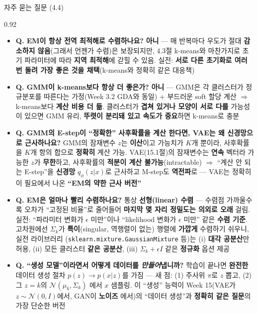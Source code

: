 \begin{frame}[shrink=33]{자주 묻는 질문 (4.4)}
\begin{center}\begin{varwidth}{0.92\textwidth}
  \small
  \begin{itemize}
    \item \textbf{Q. EM이 항상 전역 최적해로 수렴하나요?}
      \textbf{아니} --- 매 반복마다 우도가 절대 \textbf{감소하지
      않음}(그래서 언젠가 수렴)은 보장되지만, 4.3절 k-means와
      마찬가지로 초기 파라미터에 따라 \textbf{지역 최적해}에
      갇힐 수 있음. 실전: \textbf{서로 다른 초기화로 여러 번
      돌려 가장 좋은 것을 채택}(k-means와 정확히 같은 대응책)
    \item \textbf{Q. GMM이 k-means보다 항상 더 좋은가?}
      \textbf{아니} --- GMM은 각 클러스터가 정규분포를 따른다는
      가정(Week 3.2 GDA와 동일) + 부드러운 soft 할당 계산
      $\Rightarrow$ k-means보다 \textbf{계산 비용 더 듦}.
      클러스터가 \textbf{겹쳐 있거나 모양이 서로 다를} 가능성이
      있으면 GMM 유리, \textbf{뚜렷이 분리돼 있고 속도가
      중요}하면 k-means로 충분
    \item \textbf{Q. GMM의 E-step이 ``정확한'' 사후확률을 계산
      한다면, VAE는 왜 신경망으로 근사하나요?}
      GMM의 잠재변수 $z$는 \textbf{이산}이고 가능치가 $K$개
      뿐이라, 사후확률을 $K$개 항의 합으로 \textbf{정확히}
      계산 가능. VAE(15.1절)의 잠재변수는 \textbf{연속}
      벡터라 가능한 $z$가 \textbf{무한}하고, 사후확률의
      \textbf{적분이 계산 불가능}(intractable)
      $\Rightarrow$ ``계산 안 되는 E-step''을 \textbf{신경망}
      $q_\phi(z|x)$로 근사하고 M-step도 \textbf{역전파}로
      --- VAE는 정확히 이 필요에서 나온 \textbf{``EM의 약한
      근사 버전''}
    \item \textbf{Q. EM은 얼마나 빨리 수렴하나요?}
      통상 \textbf{선형(linear) 수렴} --- 수렴점 가까울수록
      오차가 ``고정된 비율''로 줄어들어 \textbf{마지막 몇 자리
      정밀도는 의외로 오래} 걸림. 실전: ``파라미터 변화가
      $\epsilon$ 미만''이나 ``likelihood 변화가 $\epsilon$
      미만'' 같은 \textbf{수렴 기준}. 고차원에선 $\Sigma_k$가
      \textbf{특이}(singular, 역행렬이 없는) 행렬에 \textbf{가깝게}
      수렴하기 쉬우니, 실전 라이브러리
      (\texttt{sklearn.mixture.GaussianMixture} 등)는
      (i) \textbf{대각 공분산}만 허용, (ii) 모든 클러스터
      \textbf{같은 공분산}, (iii) $\Sigma_k + \epsilon I$ 같은
      \textbf{정규화} 옵션 제공
    \item \textbf{Q. ``생성 모델''이라면서 어떻게 데이터를
      \emph{만들어}냅니까?}
      학습이 끝나면 \textbf{완전한} 데이터 생성 절차
      $p(z) \to p(x|z)$를 가짐 --- 새 점: (1) 주사위 $\pi$로
      $z$ 뽑고, (2) 그 $z = k$의 $\mathcal{N}(\mu_k, \Sigma_k)$
      에서 $x$ 샘플링. 이 ``생성'' 능력이 Week 15(VAE가
      $z \sim \mathcal{N}(0, I)$에서, GAN이 \textbf{노이즈}
     에서)의 ``데이터 생성''과 \textbf{정확히 같은 질문}의
      가장 단순한 버전
  \end{itemize}
\end{varwidth}\end{center}
\end{frame}
